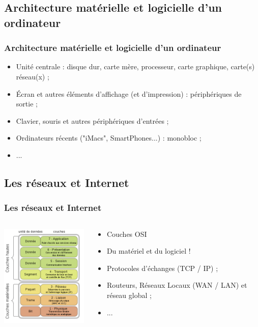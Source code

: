 \documentclass{beamer}
\begin{document}
\def\titleSection1Subsection2{Architecture mat{\'e}rielle et logicielle d'un ordinateur}
\subsection{ \titleSection1Subsection2 }
\begin{frame}
	\frametitle{ \titleSection1Subsection2 }
	\begin{itemize}
		\item Unit{\'e} centrale : disque dur, carte m{\`e}re, processeur, carte graphique, carte(s) r{\'e}seau(x) ; 
		\item {\'E}cran et autres {\'e}l{\'e}ments d'affichage (et d'impression) : p{\'e}riph{\'e}riques de sortie ; 
		\item Clavier, souris et autres p{\'e}riph{\'e}riques d'entr{\'e}es ; 
		\item Ordinateurs r{\'e}cents ("iMacs", SmartPhones...) : monobloc ; 
		\item ... 
	\end{itemize}
\end{frame}

\def\titleSection1Subsection3{Les r{\'e}seaux et Internet}
\subsection{ \titleSection1Subsection3 }
\begin{frame}
	\frametitle{ \titleSection1Subsection3 }
	\begin{columns}[T]
	\begin{column}[T]{5.0cm}
	
		\includegraphics[width=5.0cm]{resources/langfr-330px-OSI_Model_v1.svg.png} 
	
	\end{column}
	\begin{column}[T]{7.5cm}
	
		\begin{itemize}
			\item Couches OSI
			\item Du mat{\'e}riel et du logiciel !
			\item Protocoles d'{\'e}changes (TCP / IP) ; 
			\item Routeurs, R{\'e}seaux Locaux (WAN / LAN) et r{\'e}seau global ; 
			\item ... 
		\end{itemize}
		
	\end{column}
	\end{columns}
\end{frame}
\end{document}
